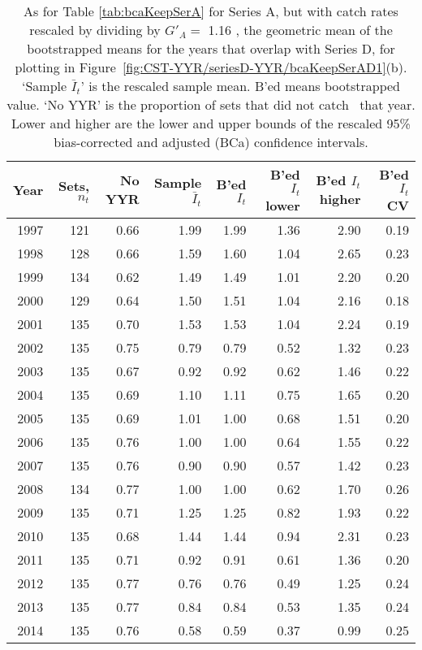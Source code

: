 \begin{table}[tp]
\centering
\caption{As for Table \ref{tab:bcaKeepSerA} for Series A, 
     but with catch rates rescaled by dividing
     by $G'_{A}=$ 1.16 , 
     the geometric mean of the bootstrapped means for the years that overlap
     with Series D, for plotting in 
     Figure~\ref{fig:CST-YYR/seriesD-YYR/bcaKeepSerAD1}(b).
     `Sample $\bar{I}_t$' is the rescaled sample mean. B'ed means bootstrapped 
     value. `No YYR' is the proportion of sets that did not catch \spName~that
     year. Lower and higher are the 
     lower and upper bounds of the rescaled 
     95\% bias-corrected and adjusted (BCa)
     confidence intervals.} 
\label{tab:serAscaled}
\begin{tabular}{rrrrrrrr}
  \hline
Year & Sets, $n_t$ & No YYR & Sample $\bar{I}_t$ & B'ed $I_t$ & B'ed $I_t$ lower & B'ed $I_t$ higher & B'ed $I_t$ CV \\ 
  \hline
1997 & 121 & 0.66 & 1.99 & 1.99 & 1.36 & 2.90 & 0.19 \\ 
  1998 & 128 & 0.66 & 1.59 & 1.60 & 1.04 & 2.65 & 0.23 \\ 
  1999 & 134 & 0.62 & 1.49 & 1.49 & 1.01 & 2.20 & 0.20 \\ 
  2000 & 129 & 0.64 & 1.50 & 1.51 & 1.04 & 2.16 & 0.18 \\ 
  2001 & 135 & 0.70 & 1.53 & 1.53 & 1.04 & 2.24 & 0.19 \\ 
  2002 & 135 & 0.75 & 0.79 & 0.79 & 0.52 & 1.32 & 0.23 \\ 
  2003 & 135 & 0.67 & 0.92 & 0.92 & 0.62 & 1.46 & 0.22 \\ 
  2004 & 135 & 0.69 & 1.10 & 1.11 & 0.75 & 1.65 & 0.20 \\ 
  2005 & 135 & 0.69 & 1.01 & 1.00 & 0.68 & 1.51 & 0.20 \\ 
  2006 & 135 & 0.76 & 1.00 & 1.00 & 0.64 & 1.55 & 0.22 \\ 
  2007 & 135 & 0.76 & 0.90 & 0.90 & 0.57 & 1.42 & 0.23 \\ 
  2008 & 134 & 0.77 & 1.00 & 1.00 & 0.62 & 1.70 & 0.26 \\ 
  2009 & 135 & 0.71 & 1.25 & 1.25 & 0.82 & 1.93 & 0.22 \\ 
  2010 & 135 & 0.68 & 1.44 & 1.44 & 0.94 & 2.31 & 0.23 \\ 
  2011 & 135 & 0.71 & 0.92 & 0.91 & 0.61 & 1.36 & 0.20 \\ 
  2012 & 135 & 0.77 & 0.76 & 0.76 & 0.49 & 1.25 & 0.24 \\ 
  2013 & 135 & 0.77 & 0.84 & 0.84 & 0.53 & 1.35 & 0.24 \\ 
  2014 & 135 & 0.76 & 0.58 & 0.59 & 0.37 & 0.99 & 0.25 \\ 
   \hline
\end{tabular}
\end{table}%
